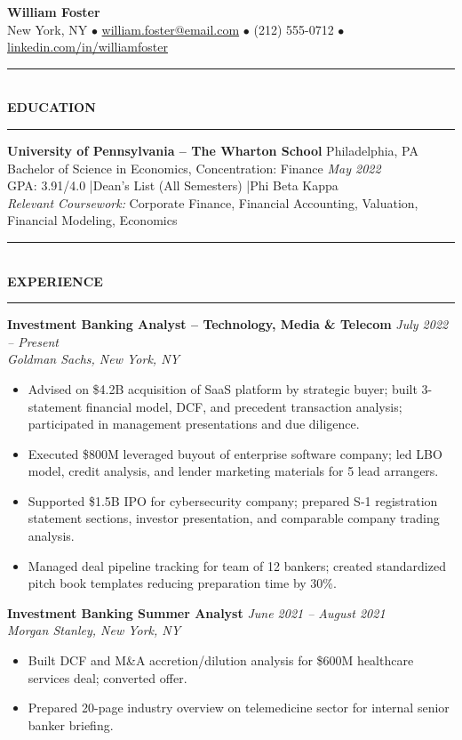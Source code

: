 \documentclass[11pt,a4paper]{article}
\newcommand{\sectionheader}[1]{%
  \vspace{4pt}
  \noindent\rule{\textwidth}{1.0pt}\\[-6pt]
  \noindent\textbf{\large #1}\\[-4pt]
  \rule{\textwidth}{0.4pt}
  \vspace{2pt}
}
\begin{document}
\begin{center}
  {\LARGE \textbf{William Foster}}\\[3pt]
  New York, NY \quad $\bullet$ \quad
  \href{mailto:william.foster@email.com}{william.foster@email.com} \quad $\bullet$ \quad
  (212) 555-0712 \quad $\bullet$ \quad
  \href{https://linkedin.com/in/williamfoster}{linkedin.com/in/williamfoster}
\end{center}

\sectionheader{EDUCATION}

\noindent\textbf{University of Pennsylvania -- The Wharton School} \hfill Philadelphia, PA\\
Bachelor of Science in Economics, Concentration: Finance \hfill \textit{May 2022}\\
GPA: 3.91/4.0 \quad|\quad Dean's List (All Semesters) \quad|\quad Phi Beta Kappa\\
\textit{Relevant Coursework:} Corporate Finance, Financial Accounting, Valuation, Financial Modeling, Economics

\sectionheader{EXPERIENCE}

\noindent\textbf{Investment Banking Analyst -- Technology, Media \& Telecom} \hfill \textit{July 2022 -- Present}\\
\textit{Goldman Sachs, New York, NY}
\begin{itemize}
  \item Advised on \$4.2B acquisition of SaaS platform by strategic buyer; built 3-statement financial model, DCF, and precedent transaction analysis; participated in management presentations and due diligence.
  \item Executed \$800M leveraged buyout of enterprise software company; led LBO model, credit analysis, and lender marketing materials for 5 lead arrangers.
  \item Supported \$1.5B IPO for cybersecurity company; prepared S-1 registration statement sections, investor presentation, and comparable company trading analysis.
  \item Managed deal pipeline tracking for team of 12 bankers; created standardized pitch book templates reducing preparation time by 30\%.
\end{itemize}

\vspace{4pt}
\noindent\textbf{Investment Banking Summer Analyst} \hfill \textit{June 2021 -- August 2021}\\
\textit{Morgan Stanley, New York, NY}
\begin{itemize}
  \item Built DCF and M\&A accretion/dilution analysis for \$600M healthcare services deal; converted offer.
  \item Prepared 20-page industry overview on telemedicine sector for internal senior banker briefing.
\end{itemize}
\end{document}
